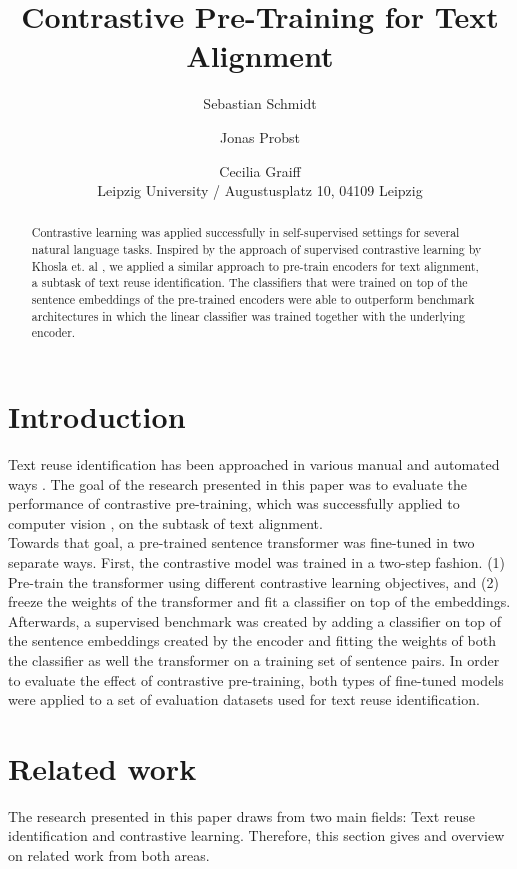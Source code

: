 \documentclass[11pt]{article}
\title{Contrastive Pre-Training for Text Alignment}
\author{Sebastian Schmidt \and Jonas Probst \and Cecilia Graiff \\
  Leipzig University / Augustusplatz 10, 04109 Leipzig
  }
\begin{document}
\maketitle
\begin{abstract}
Contrastive learning was applied successfully in self-supervised settings for several natural language tasks.
Inspired by the approach of supervised contrastive learning by Khosla et. al \cite{khosla:2020}, we applied a similar approach to pre-train encoders for text alignment, a subtask of text reuse identification.
The classifiers that were trained on top of the sentence embeddings of the pre-trained encoders were able to outperform benchmark architectures in which the linear classifier was trained together with the underlying encoder.  
\end{abstract}

\section{Introduction}
\label{sec:intro}
Text reuse identification has been approached in various manual and automated ways \cite{gienapp:2021, potthast:2013e}. 
The goal of the research presented in this paper was to evaluate the performance of contrastive pre-training, which was successfully applied to computer vision \cite{khosla:2020}, on the subtask of text alignment.\\
Towards that goal, a pre-trained sentence transformer was fine-tuned in two separate ways.
First, the contrastive model was trained in a two-step fashion. 
(1) Pre-train the transformer using different contrastive learning objectives, and (2) freeze the weights of the transformer and fit a classifier on top of the embeddings.
Afterwards, a supervised benchmark was created by adding a classifier on top of the sentence embeddings created by the encoder and fitting the weights of both the classifier as well the transformer on a training set of sentence pairs.
In order to evaluate the effect of contrastive pre-training, both types of fine-tuned models were applied to a set of evaluation datasets used for text reuse identification. 



\section{Related work}
\label{sec:relWork}
The research presented in this paper draws from two main fields: Text reuse identification and contrastive learning.
Therefore, this section gives and overview on related work from both areas.
\end{document}
